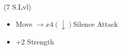\begin{spheregrid}
\begin{itemize}
		\wakkaf (7 S.Lvl)
		\begin{itemize}
			\item Move $\rightarrow x4 (\downarrow)$Silence Attack
			\item +2 Strength
		\end{itemize}
	\end{itemize}
\end{spheregrid}
\bothvfill\winvfill\lossvfill
